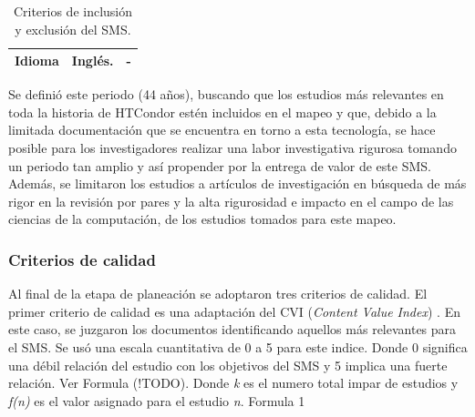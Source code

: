 \begin{table}[htbp]
\begin{tabularx}{\textwidth}{|>{\arraybackslash}m{2.3cm}|>{\arraybackslash}X|>{\arraybackslash}X|}
		\hline
		Idioma              & Inglés.                                                                                                                                                         & -                                                                                                                                               \\
		\hline
	\end{tabularx}
	\vspace{6pt}  %
	\caption{Criterios de inclusión y exclusión del SMS.}
	\label{table:Criteria}

\end{table}

Se definió este periodo (44 años), buscando que los estudios más relevantes en toda la historia de HTCondor estén incluidos en el mapeo y que, debido a la limitada documentación que se encuentra en torno a esta tecnología, se hace posible para los investigadores realizar una labor investigativa rigurosa tomando un periodo tan amplio y así propender por la entrega de valor de este SMS. Además, se limitaron los estudios a artículos de investigación en búsqueda de más rigor en la revisión por pares y la alta rigurosidad e impacto en el campo de las ciencias de la computación, de los estudios tomados para este mapeo.

\subsubsection{Criterios de calidad}
Al final de la etapa de planeación se adoptaron tres criterios de calidad.
El primer criterio de calidad es una adaptación del CVI (\textit{Content Value Index}) \cite{Almanasreh2019214, yaghmaei2003content}. En este caso, se juzgaron los documentos identificando aquellos más relevantes para el SMS. Se usó una escala cuantitativa de 0 a 5 para este indice. Donde 0 significa una débil relación del estudio con los objetivos del SMS y 5 implica una fuerte relación. Ver Formula (!TODO). Donde \textit{k} es el numero total impar de estudios y \textit{f(n)} es el valor asignado para el estudio \textit{n}.
Formula 1
